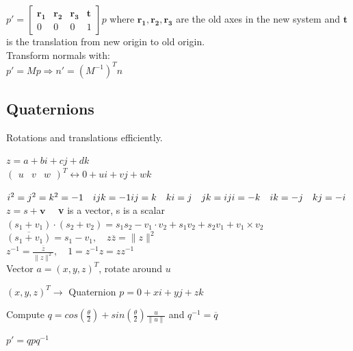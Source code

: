 
$p' = \begin{bmatrix}
    \mathbf{r_1} & \mathbf{r_2} & \mathbf{r_3} & \mathbf{t} \\
    0 & 0 & 0 & 1
\end{bmatrix}p$ where $\mathbf{r_1},\mathbf{r_2},\mathbf{r_3}$ are the old axes in the new system and $\mathbf{t}$ is the translation from new origin to old origin. \\
Transform normals with:\\
$p' = Mp \Rightarrow n' = (M^{-1})^Tn$

\subsection*{Quaternions}
Rotations and translations efficiently. 
\begin{center}
   $z = a + bi + cj + dk$\\
    $\begin{pmatrix}
    u & v & w
    \end{pmatrix}^T \leftrightarrow 0 + ui + vj + wk$
\end{center}
$i^2 = j^2 = k^2 = -1 \quad ijk = -1 \\ ij = k \quad ki = j \quad jk = i \\ ji = -k \quad ik = -j \quad kj = -i$\\
 $z = s + \mathbf{v} \quad$ \textbf{v} is a vector, s is a scalar\\
 $(s_1 + v_1) \cdot (s_2 + v_2) = s_1s_2 - v_1 \cdot v_2 + s_1v_2 + s_2v_1 + v_1 \times v_2$\\
 $\overline{(s_1 + v_1)} = s_1 - v_1, \quad z\overline{z} = \lVert z \rVert ^2 $\\
 $z^{-1} = \frac{\overline{z}}{\lVert z \rVert ^2}, \quad 1 = z^{-1}z = zz^{-1} $\\
 Vector $a = (x, y, z)^T$, rotate around $u$
\begin{compactenum}
    \item $(x,y,z)^T \rightarrow $ Quaternion $p = 0 + xi + yj + zk$
    \item Compute $q = cos(\frac{\theta}{2}) + sin(\frac{\theta}{2})\frac{u}{\lVert u \rVert}$ and $q^{-1} = \overline{q}$
    \item $p' = qpq^{-1}$
\end{compactenum}

